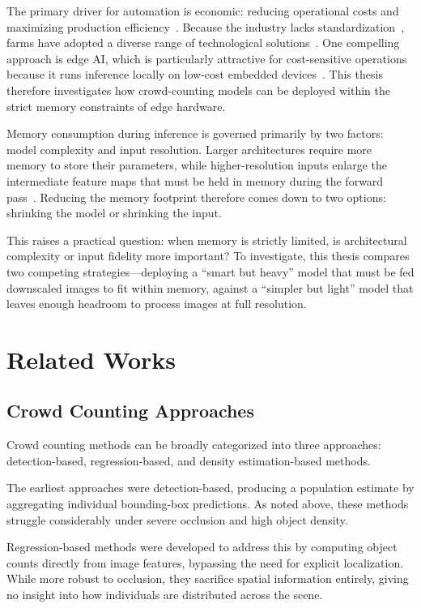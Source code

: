 \documentclass[conference]{IEEEtran}
\begin{document}
The primary driver for automation is economic: reducing operational costs and
maximizing production efficiency~\cite{rumpold2013}. Because the industry lacks
standardization~\cite{NAWOYA2024108503}, farms have adopted a diverse range of
technological solutions~\cite{CoRoSect2022AdvancedArchitecture,
kroncke2020automation}. One compelling approach is edge AI, which is
particularly attractive for cost-sensitive operations because it runs inference
locally on low-cost embedded devices~\cite{angulo2025realtimecricketsortingsex}.
This thesis therefore investigates how crowd-counting models can be deployed
within the strict memory constraints of edge hardware.

Memory consumption during inference is governed primarily by two factors: model
complexity and input resolution. Larger architectures require more memory to
store their parameters, while higher-resolution inputs enlarge the intermediate
feature maps that must be held in memory during the forward
pass~\cite{Chao2019HarDNet}. Reducing the memory footprint therefore comes down
to two options: shrinking the model or shrinking the input.

This raises a practical question: when memory is strictly limited, is
architectural complexity or input fidelity more important? To investigate, this
thesis compares two competing strategies---deploying a ``smart but heavy'' model
that must be fed downscaled images to fit within memory, against a ``simpler but
light'' model that leaves enough headroom to process images at full resolution.

\section{Related Works}
\subsection{Crowd Counting Approaches}
Crowd counting methods can be broadly categorized into three approaches:
detection-based, regression-based, and density estimation-based methods.

The earliest approaches were detection-based, producing a population estimate by
aggregating individual bounding-box predictions. As noted above, these methods
struggle considerably under severe occlusion and high object density. %

Regression-based methods were developed to address this by computing object
counts directly from image features, bypassing the need for explicit
localization. While more robust to occlusion, they sacrifice spatial information
entirely, giving no insight into how individuals are distributed across the
scene.
\end{document}
